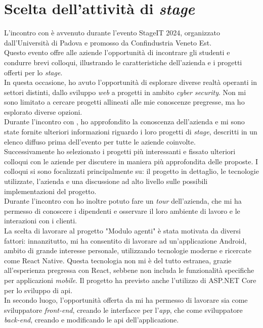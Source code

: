 \section{Scelta dell'attività di \textit{stage}}
L'incontro con {\company} è avvenuto durante l'evento StageIT 2024, organizzato dall'Università di Padova e promosso da 
Confindustria Veneto Est.\\
Questo evento offre alle aziende l'opportunità di incontrare gli studenti e condurre brevi colloqui, illustrando le 
caratteristiche dell'azienda e i progetti offerti per lo \textit{stage}.\\
In questa occasione, ho avuto l'opportunità di esplorare diverse realtà operanti in settori distinti, dallo sviluppo 
\textit{web} a progetti in ambito \textit{cyber security}. Non mi sono limitato a cercare progetti allineati alle mie 
conoscenze pregresse, ma ho esplorato diverse opzioni.\\
Durante l'incontro con {\company}, ho approfondito la conoscenza dell'azienda e mi sono state fornite ulteriori informazioni 
riguardo i loro progetti di \textit{stage}, descritti in un elenco diffuso prima dell'evento per tutte le 
aziende coinvolte.\\
Successivamente ho selezionato i progetti più interessanti e fissato ulteriori colloqui con
le aziende per discutere in maniera più approfondita delle proposte. I colloqui si sono focalizzati principalmente su: 
il progetto in dettaglio, le tecnologie utilizzate, l'azienda e una discussione ad alto livello
sulle possibili implementazioni del progetto.\\
Durante l'incontro con {\company} ho inoltre potuto fare un \textit{tour} dell'azienda, che mi ha permesso di conoscere i 
dipendenti e osservare il loro ambiente di lavoro e le interazioni con i clienti.\\
La scelta di lavorare al progetto "Modulo agenti" è stata motivata da diversi fattori:
innanzitutto, mi ha consentito di lavorare ad un'applicazione Android, ambito di grande interesse personale, utilizzando tecnologie
moderne e ricercate come React Native. Questa tecnologia non mi è del tutto estranea, grazie all'esperienza
pregressa con React, sebbene non includa le funzionalità specifiche per applicazioni \textit{mobile}. 
Il progetto ha previsto anche l'utilizzo di ASP.NET Core per lo sviluppo di \gls{api}.\\
In secondo luogo, l'opportunità offerta da {\company} mi ha permesso di lavorare sia come sviluppatore \textit{front-end},
creando le interfacce per l'\textit{app}, che come sviluppatore \textit{back-end}, creando e modificando le 
\gls{api} dell'applicazione.